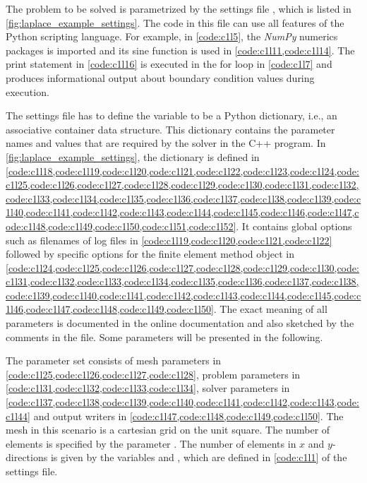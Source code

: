 The problem to be solved is parametrized by the settings file , which is listed in \cref{fig:laplace_example_settings}. The code in this file can use all features of the Python scripting language. For example, in \cref{code:c1l5}, the \emph{NumPy} numerics packages is imported and its sine function is used in \cref{code:c1l11,code:c1l14}. The print statement in \cref{code:c1l16} is executed in the for loop in \cref{code:c1l7} and produces informational output about boundary condition values during execution. 

The settings file has to define the variable  to be a Python dictionary, i.e., an associative container data structure. This dictionary contains the parameter names and values that are required by the solver in the C++ program. 
In \cref{fig:laplace_example_settings}, the  dictionary is defined in \cref{code:c1l18,code:c1l19,code:c1l20,code:c1l21,code:c1l22,code:c1l23,code:c1l24,code:c1l25,code:c1l26,code:c1l27,code:c1l28,code:c1l29,code:c1l30,code:c1l31,code:c1l32,code:c1l33,code:c1l34,code:c1l35,code:c1l36,code:c1l37,code:c1l38,code:c1l39,code:c1l40,code:c1l41,code:c1l42,code:c1l43,code:c1l44,code:c1l45,code:c1l46,code:c1l47,code:c1l48,code:c1l49,code:c1l50,code:c1l51,code:c1l52}. It contains global options such as filenames of log files in \cref{code:c1l19,code:c1l20,code:c1l21,code:c1l22} followed by specific options for the finite element method object in \cref{code:c1l24,code:c1l25,code:c1l26,code:c1l27,code:c1l28,code:c1l29,code:c1l30,code:c1l31,code:c1l32,code:c1l33,code:c1l34,code:c1l35,code:c1l36,code:c1l37,code:c1l38,code:c1l39,code:c1l40,code:c1l41,code:c1l42,code:c1l43,code:c1l44,code:c1l45,code:c1l46,code:c1l47,code:c1l48,code:c1l49,code:c1l50}. The exact meaning of all parameters is documented in the online documentation \cite{opendihuWeb} and also sketched by the comments in the file. Some parameters will be presented in the following.

The parameter set consists of mesh parameters in \cref{code:c1l25,code:c1l26,code:c1l27,code:c1l28}, problem parameters in \cref{code:c1l31,code:c1l32,code:c1l33,code:c1l34}, 
solver parameters in \cref{code:c1l37,code:c1l38,code:c1l39,code:c1l40,code:c1l41,code:c1l42,code:c1l43,code:c1l44} and output writers in \cref{code:c1l47,code:c1l48,code:c1l49,code:c1l50}. 
The mesh in this scenario is a cartesian grid on the unit square. The number of elements is specified by the parameter . The number of elements in $x$ and $y$-directions is given by the variables  and , which are defined in \cref{code:c1l1} of the settings file. 

